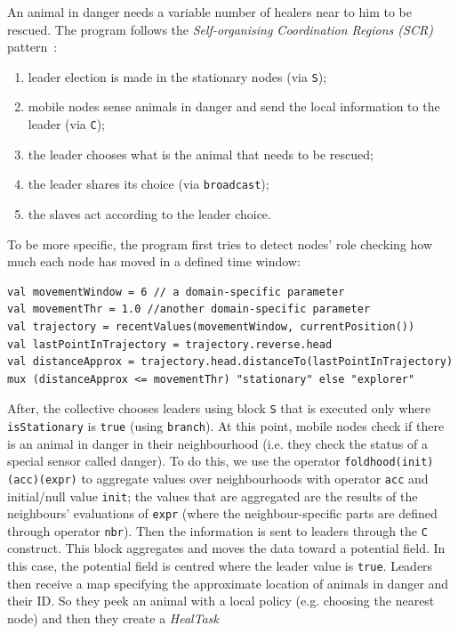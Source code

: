 %
An animal in danger needs a variable number
 of healers near to him to be rescued.
%
The program follows the \emph{Self-organising Coordination Regions (SCR)} pattern~\cite{casadei2019scr}:
%
\begin{enumerate}
\item leader election is made in the stationary nodes (via \lstinline|S|);
\item mobile nodes sense animals in danger and send the local 
 information to the leader (via \lstinline|C|);
\item the leader chooses what is the animal that needs to be rescued;
\item the leader shares its choice (via \lstinline|broadcast|);
\item the slaves act according to the leader choice.
\end{enumerate}
%
To be more specific, 
 the program first tries to detect nodes' role 
 checking how much each node has moved in a defined time window:
\begin{lstlisting}
val movementWindow = 6 // a domain-specific parameter
val movementThr = 1.0 //another domain-specific parameter
val trajectory = recentValues(movementWindow, currentPosition())
val lastPointInTrajectory = trajectory.reverse.head
val distanceApprox = trajectory.head.distanceTo(lastPointInTrajectory)
mux (distanceApprox <= movementThr) "stationary" else "explorer"
\end{lstlisting}
%
After, the collective chooses leaders using block \lstinline!S! that is executed
 only where \lstinline!isStationary! is \lstinline!true! (using \lstinline!branch!).
%
At this point, mobile nodes check if there is an animal 
 in danger in their neighbourhood (i.e. they check the status of a 
 special sensor called danger). 
% 
To do this, we use the operator \lstinline|foldhood(init)(acc)(expr)|
 to aggregate values over neighbourhoods with operator \lstinline|acc| and initial/null value \lstinline|init|; the values that are aggregated are the results of the neighbours' evaluations of \lstinline|expr| (where the neighbour-specific parts are defined through operator \lstinline|nbr|).
%
Then the information is sent to leaders through the \lstinline|C| construct.
 This block aggregates and moves the data toward a potential field. 
 In this case, the potential field is centred where the leader value is \lstinline!true!.
%
Leaders then receive a map specifying 
 the approximate location of animals in danger and their ID.
 So they peek an animal with a local policy 
 (e.g. choosing the nearest node) and then they create a \emph{HealTask} 
